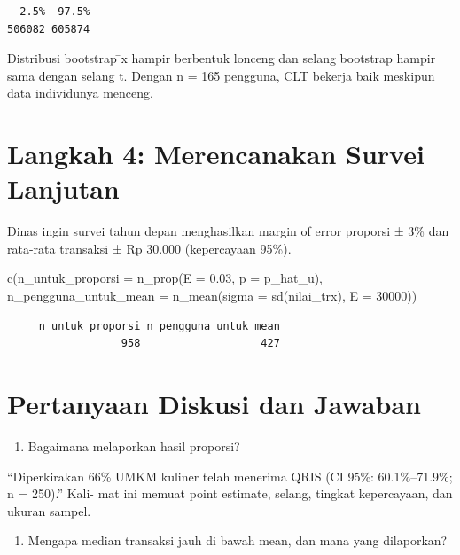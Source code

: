 \documentclass[
  indonesian,
  letterpaper,
]{book}
\newenvironment{Shaded}{\begin{snugshade}}{\end{snugshade}}
\newcommand{\AttributeTok}[1]{\textcolor[rgb]{0.40,0.45,0.13}{#1}}
\newcommand{\DecValTok}[1]{\textcolor[rgb]{0.68,0.00,0.00}{#1}}
\newcommand{\FloatTok}[1]{\textcolor[rgb]{0.68,0.00,0.00}{#1}}
\newcommand{\FunctionTok}[1]{\textcolor[rgb]{0.28,0.35,0.67}{#1}}
\newcommand{\NormalTok}[1]{\textcolor[rgb]{0.00,0.23,0.31}{#1}}
\providecommand{\tightlist}{%
  \setlength{\itemsep}{0pt}\setlength{\parskip}{0pt}}
\begin{document}
\begin{verbatim}
  2.5%  97.5% 
506082 605874 
\end{verbatim}

Distribusi bootstrap ̄x hampir berbentuk lonceng dan selang bootstrap
hampir sama dengan selang t. Dengan n = 165 pengguna, CLT bekerja baik
meskipun data individunya menceng.

\section{Langkah 4: Merencanakan Survei
Lanjutan}\label{langkah-4-merencanakan-survei-lanjutan}

Dinas ingin survei tahun depan menghasilkan margin of error proporsi ±
3\% dan rata-rata transaksi ± Rp 30.000 (kepercayaan 95\%).

\begin{Shaded}
\begin{Highlighting}[]
\FunctionTok{c}\NormalTok{(}\AttributeTok{n\_untuk\_proporsi =} \FunctionTok{n\_prop}\NormalTok{(}\AttributeTok{E =} \FloatTok{0.03}\NormalTok{, }\AttributeTok{p =}\NormalTok{ p\_hat\_u),}
\AttributeTok{n\_pengguna\_untuk\_mean =} \FunctionTok{n\_mean}\NormalTok{(}\AttributeTok{sigma =} \FunctionTok{sd}\NormalTok{(nilai\_trx), }\AttributeTok{E =} \DecValTok{30000}\NormalTok{))}
\end{Highlighting}
\end{Shaded}

\begin{verbatim}
     n_untuk_proporsi n_pengguna_untuk_mean 
                  958                   427 
\end{verbatim}

\section{Pertanyaan Diskusi dan
Jawaban}\label{pertanyaan-diskusi-dan-jawaban}

\begin{enumerate}
\def\labelenumi{\arabic{enumi}.}
\tightlist
\item
  Bagaimana melaporkan hasil proporsi?
\end{enumerate}

``Diperkirakan 66\% UMKM kuliner telah menerima QRIS (CI 95\%:
60.1\%--71.9\%; n = 250).'' Kali- mat ini memuat point estimate, selang,
tingkat kepercayaan, dan ukuran sampel.

\begin{enumerate}
\def\labelenumi{\arabic{enumi}.}
\setcounter{enumi}{1}
\tightlist
\item
  Mengapa median transaksi jauh di bawah mean, dan mana yang dilaporkan?
\end{enumerate}
\end{document}
